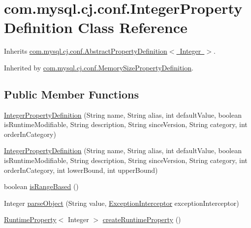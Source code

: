 \hypertarget{classcom_1_1mysql_1_1cj_1_1conf_1_1_integer_property_definition}{}\section{com.\+mysql.\+cj.\+conf.\+Integer\+Property\+Definition Class Reference}
\label{classcom_1_1mysql_1_1cj_1_1conf_1_1_integer_property_definition}


Inherits \mbox{\hyperlink{classcom_1_1mysql_1_1cj_1_1conf_1_1_abstract_property_definition}{com.\+mysql.\+cj.\+conf.\+Abstract\+Property\+Definition$<$ Integer $>$}}.



Inherited by \mbox{\hyperlink{classcom_1_1mysql_1_1cj_1_1conf_1_1_memory_size_property_definition}{com.\+mysql.\+cj.\+conf.\+Memory\+Size\+Property\+Definition}}.

\subsection*{Public Member Functions}
\begin{DoxyCompactItemize}
\item 
\mbox{\hyperlink{classcom_1_1mysql_1_1cj_1_1conf_1_1_integer_property_definition_a5633ed14140d3ee4f23a8b0fe9a2f378}{Integer\+Property\+Definition}} (String name, String alias, int default\+Value, boolean is\+Runtime\+Modifiable, String description, String since\+Version, String category, int order\+In\+Category)
\item 
\mbox{\hyperlink{classcom_1_1mysql_1_1cj_1_1conf_1_1_integer_property_definition_abbc937397a11c912ca0a26f180b61df9}{Integer\+Property\+Definition}} (String name, String alias, int default\+Value, boolean is\+Runtime\+Modifiable, String description, String since\+Version, String category, int order\+In\+Category, int lower\+Bound, int upper\+Bound)
\item 
boolean \mbox{\hyperlink{classcom_1_1mysql_1_1cj_1_1conf_1_1_integer_property_definition_ada0b35723ac1fe8089ecbbf357d30b1a}{is\+Range\+Based}} ()
\item 
Integer \mbox{\hyperlink{classcom_1_1mysql_1_1cj_1_1conf_1_1_integer_property_definition_a03819bef8deb0e4f6072d7ee1f9028d5}{parse\+Object}} (String value, \mbox{\hyperlink{interfacecom_1_1mysql_1_1cj_1_1exceptions_1_1_exception_interceptor}{Exception\+Interceptor}} exception\+Interceptor)
\item 
\mbox{\hyperlink{interfacecom_1_1mysql_1_1cj_1_1conf_1_1_runtime_property}{Runtime\+Property}}$<$ Integer $>$ \mbox{\hyperlink{classcom_1_1mysql_1_1cj_1_1conf_1_1_integer_property_definition_a446876e16f36d1c1731cfdf5174b7942}{create\+Runtime\+Property}} ()
\end{DoxyCompactItemize}
